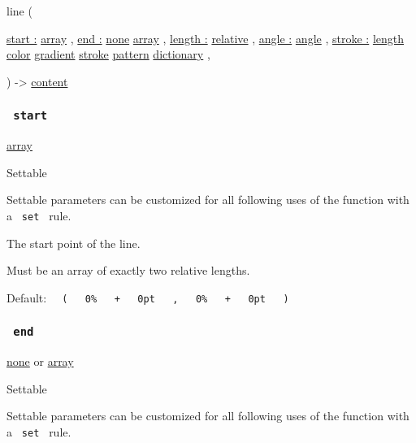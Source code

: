 { line } (

{ \hyperref[parameters-start]{start :}
\href{/docs/reference/foundations/array/}{array} , } {
\hyperref[parameters-end]{end :}
\href{/docs/reference/foundations/none/}{none}
\href{/docs/reference/foundations/array/}{array} , } {
\hyperref[parameters-length]{length :}
\href{/docs/reference/layout/relative/}{relative} , } {
\hyperref[parameters-angle]{angle :}
\href{/docs/reference/layout/angle/}{angle} , } {
\hyperref[parameters-stroke]{stroke :}
\href{/docs/reference/layout/length/}{length}
\href{/docs/reference/visualize/color/}{color}
\href{/docs/reference/visualize/gradient/}{gradient}
\href{/docs/reference/visualize/stroke/}{stroke}
\href{/docs/reference/visualize/pattern/}{pattern}
\href{/docs/reference/foundations/dictionary/}{dictionary} , }

) -\textgreater{} \href{/docs/reference/foundations/content/}{content}

\subsubsection{\texorpdfstring{\texttt{\ start\ }}{ start }}\label{parameters-start}

\href{/docs/reference/foundations/array/}{array}

{{ Settable }}

\label{parameters-start-settable-tooltip}
Settable parameters can be customized for all following uses of the
function with a \texttt{\ set\ } rule.

The start point of the line.

Must be an array of exactly two relative lengths.

Default:
\texttt{\ }{\texttt{\ (\ }}\texttt{\ }{\texttt{\ 0\%\ }}\texttt{\ }{\texttt{\ +\ }}\texttt{\ }{\texttt{\ 0pt\ }}\texttt{\ }{\texttt{\ ,\ }}\texttt{\ }{\texttt{\ 0\%\ }}\texttt{\ }{\texttt{\ +\ }}\texttt{\ }{\texttt{\ 0pt\ }}\texttt{\ }{\texttt{\ )\ }}\texttt{\ }

\subsubsection{\texorpdfstring{\texttt{\ end\ }}{ end }}\label{parameters-end}

\href{/docs/reference/foundations/none/}{none} {or}
\href{/docs/reference/foundations/array/}{array}

{{ Settable }}

\label{parameters-end-settable-tooltip}
Settable parameters can be customized for all following uses of the
function with a \texttt{\ set\ } rule.

